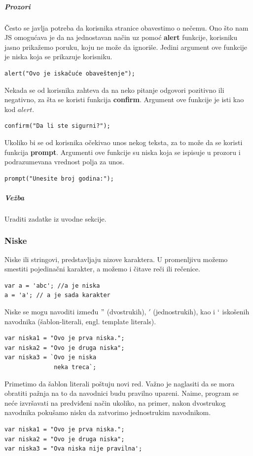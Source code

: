 \documentclass[a4paper]{article}
\begin{document}
\subparagraph{Prozori}
Često se javlja potreba da korisnika stranice obavestimo o nečemu. Ono što nam JS omogućava je da na jednostavan način uz pomoć \textbf{alert} funkcije, korisniku jasno prikažemo poruku, koju ne može da ignoriše. Jedini argument ove funkcije je niska koja se prikazuje korisniku. 
\begin{verbatim}
alert("Ovo je iskačuće obaveštenje");
\end{verbatim}
Nekada se od korisnika zahteva da na neko pitanje odgovori pozitivno ili negativno, za šta se koristi funkcija \textbf{confirm}. Argument ove funkcije je isti kao kod $alert$. 
\begin{verbatim}
confirm("Da li ste sigurni?");
\end{verbatim}
Ukoliko bi se od korisnika očekivao unos nekog teksta, za to može da se koristi funkcija \textbf{prompt}. Argumenti ove funkcije su niska koja se ispisuje u prozoru i podrazumevana vrednost polja za unos. 
\begin{verbatim}
prompt("Unesite broj godina:");
\end{verbatim}
\subparagraph{Vežba}
Uraditi zadatke iz uvodne sekcije.

\subsubsection{Niske}
Niske ili stringovi, predstavljaju nizove karaktera. U promenljivu možemo smestiti pojedinačni karakter, a možemo i čitave reči ili rečenice. \\
\begin{verbatim}
var a = 'abc'; //a je niska
a = 'a'; // a je sada karakter
\end{verbatim}
Niske se mogu navoditi između $"$ (dvostrukih), $'$ (jednostrukih), kao i $`$ iskošenih navodnika (šablon-literali, engl. template literals).  
\begin{verbatim}
var niska1 = "Ovo je prva niska.";
var niska2 = "Ovo je druga niska";
var niska3 = `Ovo je niska
              neka treca`;
\end{verbatim}
Primetimo da šablon literali poštuju novi red. Važno je naglasiti da se mora obratiti pažnja na to da navodnici budu pravilno upareni. Naime, program se neće izvršavati na predviđeni način ukoliko, na primer, nakon dvostrukog navodnika pokušamo nisku da zatvorimo jednostrukim navodnikom.
\begin{verbatim}
var niska1 = "Ovo je prva niska.";
var niska2 = "Ovo je druga niska";
var niska3 = "Ova niska nije pravilna';
\end{verbatim}
\end{document}
